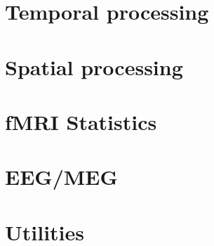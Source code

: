 \documentclass[a4paper,titlepage]{book}
\begin{document}
\dominitoc\tableofcontents

\newpage



%


\part{Temporal processing}




\part{Spatial processing}









\part{fMRI Statistics}



%


\part{EEG/MEG}


%







\part{Utilities}








\end{document}
